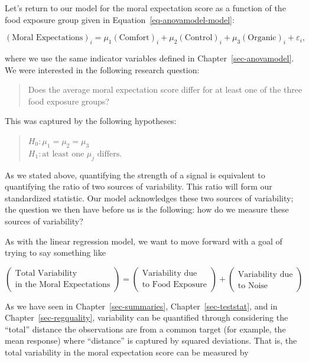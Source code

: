 \documentclass[
  letterpaper,
  DIV=11,
  numbers=noendperiod]{scrreprt}
\theoremstyle{definition}
\theoremstyle{definition}
\theoremstyle{plain}
\theoremstyle{remark}
\begin{document}
Let's return to our model for the moral expectation score as a function
of the food exposure group given in Equation~\ref{eq-anovamodel-model}:

\[(\text{Moral Expectations})_i = \mu_1 (\text{Comfort})_i + \mu_2 (\text{Control})_i + \mu_3 (\text{Organic})_i + \varepsilon_i,\]

where we use the same indicator variables defined in
Chapter~\ref{sec-anovamodel}. We were interested in the following
research question:

\begin{quote}
Does the average moral expectation score differ for at least one of the
three food exposure groups?
\end{quote}

This was captured by the following hypotheses:

\begin{quote}
\(H_0: \mu_1 = \mu_2 = \mu_3\)\\
\(H_1: \text{at least one } \mu_j \text{ differs}.\)
\end{quote}

As we stated above, quantifying the strength of a signal is equivalent
to quantifying the ratio of two sources of variability. This ratio will
form our standardized statistic. Our model acknowledges these two
sources of variability; the question we then have before us is the
following: how do we measure these sources of variability?

As with the linear regression model, we want to move forward with a goal
of trying to say something like

\[\begin{pmatrix} \text{Total Variability} \\ \text{in the Moral Expectations} \end{pmatrix} = \begin{pmatrix} \text{Variability due} \\ \text{to Food Exposure} \end{pmatrix} + \begin{pmatrix} \text{Variability due} \\ \text{to Noise} \end{pmatrix}\]

As we have seen in Chapter~\ref{sec-summaries},
Chapter~\ref{sec-teststat}, and in Chapter~\ref{sec-regquality},
variability can be quantified through considering the ``total'' distance
the observations are from a common target (for example, the mean
response) where ``distance'' is captured by squared deviations. That is,
the total variability in the moral expectation score can be measured by
\end{document}
